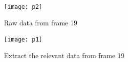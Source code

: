 \documentclass[10pt,a4paper]{article}
\begin{document}
\vspace{-10pt}
\hspace{-40pt}
\begin{figure}[!h]
\hspace{-50pt}
\begin{minipage}[t]{0.74 \linewidth}
	
	\centering
	\texttt{[image: p2]}
	\caption{ \small Raw data from frame 19}
    \label{fig:21}
\end{minipage}
\hspace{-100pt}
\begin{minipage}[t]{0.74 \linewidth}
	\centering
	\texttt{[image: p1]}
	\caption{ \small Extract the relevant data from frame 19}
    \label{fig:22}
\end{minipage}
\end{figure}
\end{document}
